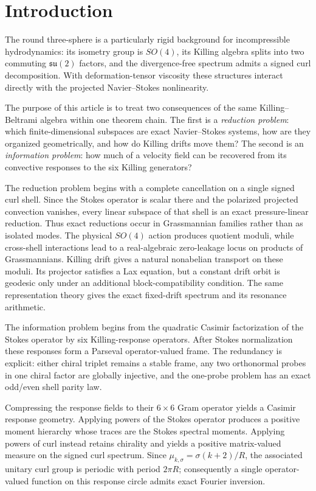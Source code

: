 \documentclass[
 aps,
 prd,
 reprint,
 amsmath,
 amssymb,
 nofootinbib,
 superscriptaddress
]{revtex4-2}
\theoremstyle{definition}
\theoremstyle{remark}
\begin{document}
\section{Introduction}

The round three-sphere is a particularly rigid background for incompressible
hydrodynamics: its isometry group is \(SO(4)\), its Killing algebra splits
into two commuting \(\mathfrak{su}(2)\) factors, and the divergence-free
spectrum admits a signed curl decomposition.  With deformation-tensor
viscosity these structures interact directly with the projected
Navier--Stokes nonlinearity.

The purpose of this article is to treat two consequences of the same
Killing--Beltrami algebra within one theorem chain.  The first is a
\emph{reduction problem}: which finite-dimensional subspaces are exact
Navier--Stokes systems, how are they organized geometrically, and how do
Killing drifts move them?  The second is an \emph{information problem}: how
much of a velocity field can be recovered from its convective responses to
the six Killing generators?

The reduction problem begins with a complete cancellation on a single
signed curl shell.  Since the Stokes operator is scalar there and the
polarized projected convection vanishes, every linear subspace of that shell
is an exact pressure-linear reduction.  Thus exact reductions occur in
Grassmannian families rather than as isolated modes.  The physical
\(SO(4)\) action produces quotient moduli, while cross-shell interactions
lead to a real-algebraic zero-leakage locus on products of Grassmannians.
Killing drift gives a natural nonabelian transport on these moduli.  Its
projector satisfies a Lax equation, but a constant drift orbit is geodesic
only under an additional block-compatibility condition.  The same
representation theory gives the exact fixed-drift spectrum and its
resonance arithmetic.

The information problem begins from the quadratic Casimir factorization of
the Stokes operator by six Killing-response operators.  After Stokes
normalization these responses form a Parseval operator-valued frame.  The
redundancy is explicit: either chiral triplet remains a stable frame, any
two orthonormal probes in one chiral factor are globally injective, and the
one-probe problem has an exact odd/even shell parity law.

Compressing the response fields to their \(6\times6\) Gram operator yields
a Casimir response geometry.  Applying powers of the Stokes operator
produces a positive moment hierarchy whose traces are the Stokes spectral
moments.  Applying powers of curl instead retains chirality and yields a
positive matrix-valued measure on the signed curl spectrum.  Since
\(\mu_{k,\sigma}=\sigma(k+2)/R\), the associated unitary curl group is
periodic with period \(2\pi R\); consequently a single operator-valued
function on this response circle admits exact Fourier inversion.
\end{document}
